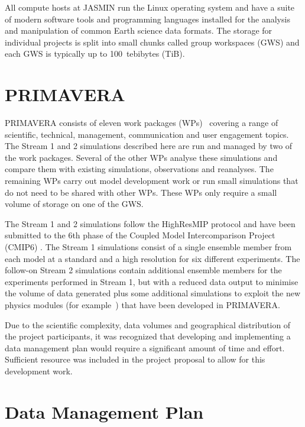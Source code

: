\documentclass[gmd, manuscript]{copernicus}
\begin{document}
All compute hosts at JASMIN run the Linux operating system and have a suite of modern software tools and programming languages installed for the analysis and manipulation of common Earth science data formats. The storage for individual projects is split into small chunks called group workspaces (GWS) and each GWS is typically up to 100~tebibytes (TiB).

\section{PRIMAVERA}

PRIMAVERA consists of eleven work packages (WPs)~\citep{GrantAgree} covering a range of scientific, technical, management, communication and user engagement topics. The Stream 1 and 2 simulations described here are run and managed by two of the work packages. Several of the other WPs analyse these simulations and compare them with existing simulations, observations and reanalyses. The remaining WPs carry out model development work or run small simulations that do not need to be shared with other WPs. These WPs only require a small volume of storage on one of the GWS.

The Stream 1 and 2 simulations follow the HighResMIP protocol and have been submitted to the 6th phase of the Coupled Model Intercomparison Project (CMIP6) \citep{Eyring2016}. The Stream 1 simulations consist of a single ensemble member from each model at a standard and a high resolution for six different experiments. The follow-on Stream 2 simulations contain additional ensemble members for the experiments performed in Stream 1, but with a reduced data output to minimise the volume of data generated plus some additional simulations to exploit the new physics modules (for example~\cite{Nurser2020}) that have been developed in PRIMAVERA.

Due to the scientific complexity, data volumes and geographical distribution of the project participants, it was recognized that developing and implementing a data management plan would require a significant amount of time and effort. Sufficient resource was included in the project proposal to allow for this development work.


\section{Data Management Plan}
\end{document}
